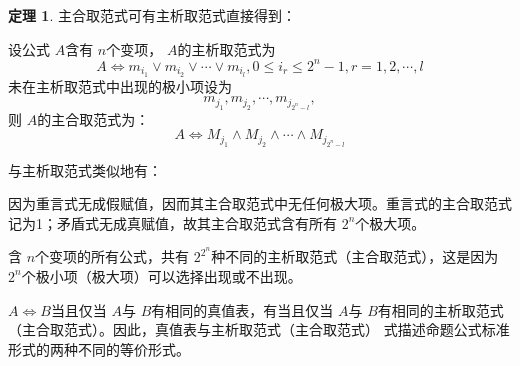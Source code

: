 \documentclass[a4paper,11pt]{article}%
\theoremstyle{remark}
\theoremstyle{remark}
\theoremstyle{definition}
\newtheorem{theorem}{定理}[section]
\theoremstyle{definition}
\theoremstyle{plain}
\begin{document}
\begin{theorem}
    主合取范式可有主析取范式直接得到：
    
    设公式 $A$含有 $n$个变项， $A$的主析取范式为
    \[A\Leftrightarrow m_{i_1}\lor m_{i_2}\lor\cdots\lor m_{i_l},0\leq i_r\leq 2^n-1,r=1,2,\cdots,l\]
    未在主析取范式中出现的极小项设为
    \[m_{j_1},m_{j_2},\cdots,m_{j_{2^n-l}},\]
    则 $A$的主合取范式为：
    \[A\Leftrightarrow M_{j_1}\land M_{j_2}\land\cdots\land M_{j_{2^n-l}}\]
\end{theorem}
与主析取范式类似地有：

因为重言式无成假赋值，因而其主合取范式中无任何极大项。重言式的主合取范式记为1；矛盾式无成真赋值，故其主合取范式含有所有 $2^n$个极大项。

含 $n$个变项的所有公式，共有 $2^{2^n}$种不同的主析取范式（主合取范式），这是因为 $2^n$个极小项（极大项）可以选择出现或不出现。

$A\Leftrightarrow B$当且仅当 $A$与 $B$有相同的真值表，有当且仅当 $A$与 $B$有相同的主析取范式（主合取范式）。因此，真值表与主析取范式（主合取范式）
式描述命题公式标准形式的两种不同的等价形式。
\end{document}
